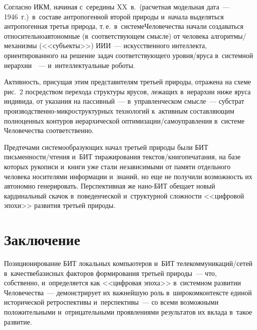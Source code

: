 \begin{multicols}{2}
  Согласно ИКМ, начиная с~середины XX~в.\ (расчетная модельная дата~--- 
1946~г.)\ в~составе антропогенной второй природы и~начала выделяться 
антропогенная третья природа, т.\,е.\ в~сис\-те\-ме\linebreak \mbox{Человечества} начали 
создаваться относительно\linebreak автономные (в~соответствующем смысле) от 
человека ал\-го\-рит\-мы/ме\-ха\-низ\-мы (<<субъекты>>) ИИИ~--- искусственного интеллекта, 
ориентированного на решение задач со\-от\-вет\-ст\-ву\-юще\-го уров\-ня/яру\-са 
в~сис\-тем\-ной иерархии~\cite{5-gri, 6-gri}~--- и~интеллектуальные роботы. 

  
  Активность, присущая этим представителям третьей природы, отражена на 
схеме рис.~2 посредством перехода структуры ярусов, лежащих 
в~иерархии ниже яруса индивида, от указания на \mbox{пассивный}~---  
в~управ\-лен\-че\-ском смысле~--- субстрат  
про\-из\-вод\-ст\-вен\-но-мик\-ро\-струк\-тур\-ных технологий к~активным 
составляющим полноценных контуров иерархической  
оп\-ти\-ми\-за\-ции/са\-мо\-управ\-ле\-ния в~системе Человечества 
соответственно.
  




  Предтечами системообразующих начал третьей природы были БИТ  
пись\-мен\-ности/чте\-ния и~БИТ тиражирования  
текс\-тов/кни\-го\-пе\-ча\-та\-ния, на базе которых рукописи и~книги уже стали 
независимыми от памяти отдельного человека носителями информации 
и~знаний, но еще не получили воз\-мож\-ность их автономно генерировать. 
Перспективная же на\-но-БИТ обещает новый кардинальный скачок 
в~поведенческой и~структурной слож\-ности <<циф\-ро\-вой эпохи>> развития 
третьей природы.
  
\section{Заключение}

  Позиционирование БИТ локальных компьютеров и~БИТ 
телекоммуникаций/сетей в~качестве\linebreak базисных факторов формирования третьей 
природы~--- что, собственно, и~определяется как <<циф\-ро\-вая эпоха>> 
в~сис\-тем\-ном развитии Человечества~--- демонстрирует их важнейшую роль 
в~широком\linebreak \mbox{контексте} единой исторической ретроспективы и~перспективы~--- 
со всеми возможными положительными и~отрицательными проявлениями 
результатов их вклада в~такое развитие.
  

\end{multicols}

